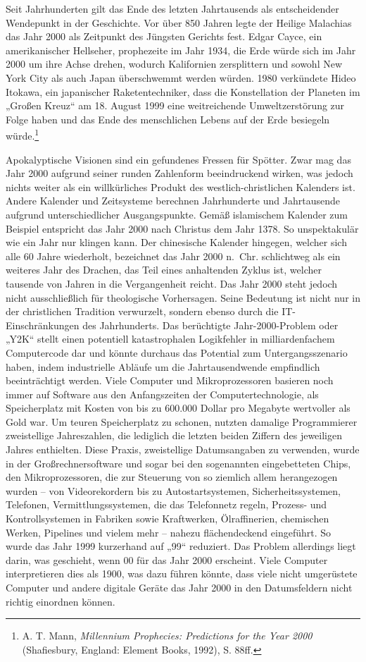 \documentclass[
  a5paper,
  smalldemyvopaper,10pt,twoside,onecolumn,openright,extrafontsizes,hidelinks]{memoir}
\begin{document}
Seit Jahrhunderten gilt das Ende des letzten Jahrtausends als
entscheidender Wendepunkt in der Geschichte. Vor über 850 Jahren legte
der Heilige Malachias das Jahr 2000 als Zeitpunkt des Jüngsten Gerichts
fest. Edgar Cayce, ein amerikanischer Hellseher, prophezeite im Jahr
1934, die Erde würde sich im Jahr 2000 um ihre Achse drehen, wodurch
Kalifornien zersplittern und sowohl New York City als auch Japan
überschwemmt werden würden. 1980 verkündete Hideo Itokawa, ein
japanischer Raketentechniker, dass die Konstellation der Planeten im
„Großen Kreuz`` am 18. August 1999 eine weitreichende Umweltzerstörung
zur Folge haben und das Ende des menschlichen Lebens auf der Erde
besiegeln würde.\footnote{A. T. Mann, \emph{Millennium Prophecies:
  Predictions for the Year 2000} (Shafiesbury, England: Element Books,
  1992), S. 88ff.}

Apokalyptische Visionen sind ein gefundenes Fressen für Spötter. Zwar
mag das Jahr 2000 aufgrund seiner runden Zahlenform beeindruckend
wirken, was jedoch nichts weiter als ein willkürliches Produkt des
westlich-christlichen Kalenders ist. Andere Kalender und Zeitsysteme
berechnen Jahrhunderte und Jahrtausende aufgrund unterschiedlicher
Ausgangspunkte. Gemäß islamischem Kalender zum Beispiel entspricht das
Jahr 2000 nach Christus dem Jahr 1378. So unspektakulär wie ein Jahr nur
klingen kann. Der chinesische Kalender hingegen, welcher sich alle 60
Jahre wiederholt, bezeichnet das Jahr 2000 n.~Chr. schlichtweg als ein
weiteres Jahr des Drachen, das Teil eines anhaltenden Zyklus ist,
welcher tausende von Jahren in die Vergangenheit reicht. Das Jahr 2000
steht jedoch nicht ausschließlich für theologische Vorhersagen. Seine
Bedeutung ist nicht nur in der christlichen Tradition verwurzelt,
sondern ebenso durch die IT-Einschränkungen des Jahrhunderts. Das
berüchtigte Jahr-2000-Problem oder „Y2K`` stellt einen potentiell
katastrophalen Logikfehler in milliardenfachem Computercode dar und
könnte durchaus das Potential zum Untergangsszenario haben, indem
industrielle Abläufe um die Jahrtausendwende empfindlich beeinträchtigt
werden. Viele Computer und Mikroprozessoren basieren noch immer auf
Software aus den Anfangszeiten der Computertechnologie, als
Speicherplatz mit Kosten von bis zu 600.000 Dollar pro Megabyte
wertvoller als Gold war. Um teuren Speicherplatz zu schonen, nutzten
damalige Programmierer zweistellige Jahreszahlen, die lediglich die
letzten beiden Ziffern des jeweiligen Jahres enthielten. Diese Praxis,
zweistellige Datumsangaben zu verwenden, wurde in der
Großrechnersoftware und sogar bei den sogenannten eingebetteten Chips,
den Mikroprozessoren, die zur Steuerung von so ziemlich allem
herangezogen wurden -- von Videorekordern bis zu Autostartsystemen,
Sicherheitssystemen, Telefonen, Vermittlungssystemen, die das
Telefonnetz regeln, Prozess- und Kontrollsystemen in Fabriken sowie
Kraftwerken, Ölraffinerien, chemischen Werken, Pipelines und vielem mehr
-- nahezu flächendeckend eingeführt. So wurde das Jahr 1999 kurzerhand
auf „99`` reduziert. Das Problem allerdings liegt darin, was geschieht,
wenn 00 für das Jahr 2000 erscheint. Viele Computer interpretieren dies
als 1900, was dazu führen könnte, dass viele nicht umgerüstete Computer
und andere digitale Geräte das Jahr 2000 in den Datumsfeldern nicht
richtig einordnen können.
\end{document}
